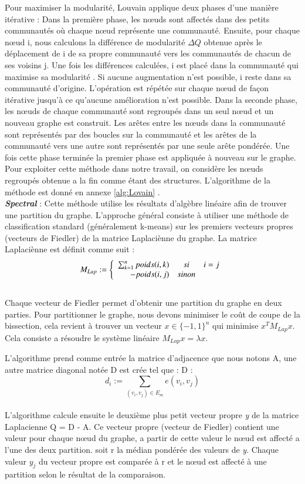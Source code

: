 \documentclass[a4paper,oneside,12pt]{report}
\theoremstyle{definition}
\begin{document}
\begin{enumerate}
Pour maximiser la modularité, Louvain applique deux phases d'une manière itérative : Dans la première phase, les nœuds sont affectés dans des petits communautés où chaque nœud représente une communauté. Ensuite, pour chaque nœud i, nous calculons la différence de modularité $\Delta\textit{Q}$ obtenue après le déplacement de i de sa propre communauté vers les communautés de chacun de ses voisins j. Une fois les différences calculées, i est placé dans la communauté qui maximise sa modularité  . Si aucune augmentation n'est possible, i reste dans sa communauté d'origine. L'opération est répétée sur chaque nœud de façon itérative jusqu'à ce qu'aucune amélioration n'est possible.
Dans la seconde phase, les nœuds de chaque communauté sont regroupés dans un seul nœud et un nouveau graphe est construit. Les arêtes entre les nœuds dans la communauté sont représentés par des boucles sur la communauté et les arêtes de la communauté vers une autre sont représentés par une seule arête pondérée. Une fois cette phase terminée la premier phase est appliquée à nouveau sur le graphe. Pour exploiter cette méthode dans notre travail, on considère les nœuds regroupés obtenue a la fin comme étant des structures. L'algorithme de la méthode est donné en annexe \ref{alg:Lovain} .\\

\textbf{\textit{Spectral}} : Cette méthode utilise les résultats d'algèbre linéaire afin de trouver une partition du graphe. L'approche général consiste à utiliser une méthode de classification standard (généralement k-means) sur  les premiers vecteurs propres (vecteurs de Fiedler) de la matrice Laplaciènne du graphe. La matrice Laplaciènne est définit comme suit : 
\[{M}_{Lap} :=
			\left\{
			\begin{array}{r c l}
			\sum_{k=1}^n poids(i,k)   & si & i=j \\
			-poids(i,j) & sinon
			\end{array}
			\right.
			\]
			\\
Chaque vecteur de Fiedler permet d’obtenir une partition du graphe en
deux parties. Pour partitionner le graphe, nous devons minimiser le coût de coupe de la bissection, cela revient à trouver un vecteur $x \in \{-1,1\}^n $ qui minimise $x^T M_{Lap}x$. Cela consiste a résoudre le système linéaire $M_{Lap}x = \lambda x$.

L'algorithme prend comme entrée la matrice d'adjacence que nous notons A, une autre matrice diagonal notée D est crée tel que :    
D : \[{d}_{i} := \sum_{(v_i,v_j) \in E_m} e(v_i,v_j)
			\]
			\\
L'algorithme calcule ensuite le deuxième plus petit vecteur propre \textit{y} de la matrice Laplacienne Q = D - A. Ce vecteur propre (vecteur de Fiedler) contient une valeur pour chaque nœud du graphe, a partir de cette valeur le nœud est affecté a l'une des deux partition. soit r la médian pondérée des valeurs de \textit{y}. Chaque valeur $y_j$ du vecteur propre est comparée à r et le nœud est affecté à une partition selon le résultat de la comparaison.\\
	


\end{enumerate}
\end{document}
